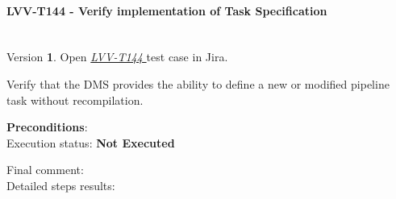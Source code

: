 \documentclass[DM,lsstdraft,STR,toc]{lsstdoc}
\begin{document}
\paragraph{ LVV-T144 - Verify implementation of Task Specification }\mbox{}\\

Version \textbf{1}.
Open  \href{https://jira.lsstcorp.org/secure/Tests.jspa#/testCase/LVV-T144}{\textit{ LVV-T144 } }
test case in Jira.

Verify that the DMS provides the ability to define a new or modified
pipeline task without recompilation.

\textbf{ Preconditions}:\\


Execution status: {\bf Not Executed }

Final comment:\\


Detailed steps results:
\end{document}

